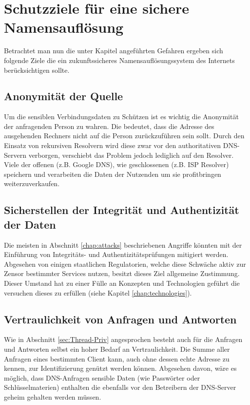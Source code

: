 \chapter{Schutzziele für eine sichere Namensauflösung}
\label{chap:goals}

Betrachtet man nun die unter Kapitel \label{cap:threads} angeführten Gefahren ergeben sich folgende Ziele die ein zukunftssicheres Namensauflösungssystem des Internets berücksichtigen sollte\cite{Grothoff2018}. 

\section{Anonymität der Quelle}
\label{subsec:goals-sourceanon}
Um die sensiblen Verbindungsdaten zu Schützen ist es wichtig die Anonymität der anfragenden Person zu wahren. Die bedeutet, dass die Adresse des ausgehenden Rechners nicht auf die Person zurückzuführen sein sollt. Durch den Einsatz von rekursiven Resolvern wird diese zwar vor den authoritativen DNS-Servern verborgen, verschiebt das Problem jedoch lediglich auf den Resolver. Viele der offenen (z.B. Google DNS), wie geschlossenen (z.B. ISP Resolver) speichern und verarbeiten die Daten der Nutzenden um sie profitbringen weiterzuverkaufen.

\section{Sicherstellen der Integrität und Authentizität der Daten}
\label{subsec:goals-recordsecurity}
Die meisten in Abschnitt \ref{chap:attacks} beschriebenen Angriffe könnten mit der Einführung von Integritäts- und Authentizitätsprüfungen mitigiert werden. Abgesehen von einigen staatlichen Regulatorien, welche diese Schwäche aktiv zur Zensor bestimmter Services nutzen, besitzt dieses Ziel allgemeine Zustimmung. Dieser Umstand hat zu einer Fülle an Konzepten und Technologien geführt die versuchen dieses zu erfüllen (siehe Kapitel \ref{chap:technologies}). 

\section{Vertraulichkeit von Anfragen und Antworten}
\label{subsec:goals-requestsecurity}
Wie in Abschnitt \ref{sec:Thread-Priv} angesprochen besteht auch für die Anfragen und Antworten selbst ein hoher Bedarf an Vertraulichkeit. Die Summe aller Anfragen eines bestimmten Client kann, auch ohne dessen echte Adresse zu kennen, zur Identifizierung genützt werden können. Abgesehen davon, wäre es möglich, dass DNS-Anfragen sensible Daten (wie Passwörter oder Schlüsselmaterien) enthalten die ebenfalls vor den Betreibern der DNS-Server geheim gehalten werden müssen.

